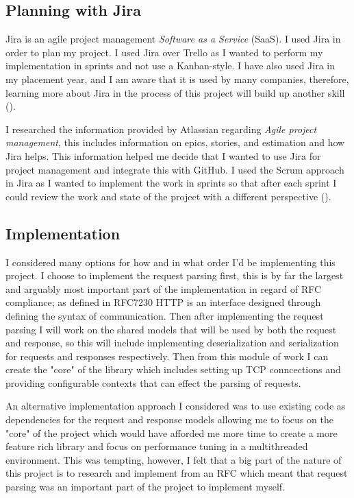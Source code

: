 \documentclass[12pt, a4paper]{article}
\begin{document}
\subsection{Planning with Jira}

Jira is an agile project management \emph{Software as a Service} (SaaS). I used Jira in order to
plan my project. I used Jira over Trello as I wanted to perform my implementation in
sprints and not use a Kanban-style. I have also used Jira in my placement year, and I am aware that it 
is used by many companies, therefore, learning more about Jira in the process of this 
project will build up another skill (\cite{jira}).

I researched the information provided by Atlassian regarding \emph{Agile project management},
this includes information on epics, stories, and estimation and how Jira helps. This information
helped me decide that I wanted to use Jira for project management and integrate this with GitHub.
I used the Scrum approach in Jira as I wanted to implement the work in sprints so that after each
sprint I could review the work and state of the project with a different perspective
(\cite{jira-agile-info}). 

\subsection{Implementation} \label{ssec:implementation}

I considered many options for how and in what order I'd be implementing this project. I choose
to implement the request parsing first, this is by far the largest and arguably most important part
of the implementation in regard of RFC compliance; as defined in RFC7230 HTTP is an interface designed
through defining the syntax of communication. Then after implementing the request parsing I will
work on the shared models that will be used by both the request and response, so this will include implementing
deserialization and serialization for requests and responses respectively. Then from this module of
work I can create the "core" of the library which includes setting up TCP conncections and providing
configurable contexts that can effect the parsing of requests. 

An alternative implementation approach I considered was to use existing code as dependencies for the
request and response models allowing me to focus on the "core" of the project which would have afforded
me more time to create a more feature rich library and focus on performance tuning in a multithreaded
environment. This was tempting, however, I felt that a big part of the nature of this project is to
research and implement from an RFC which meant that request parsing was an important part of the
project to implement myself.
\end{document}

